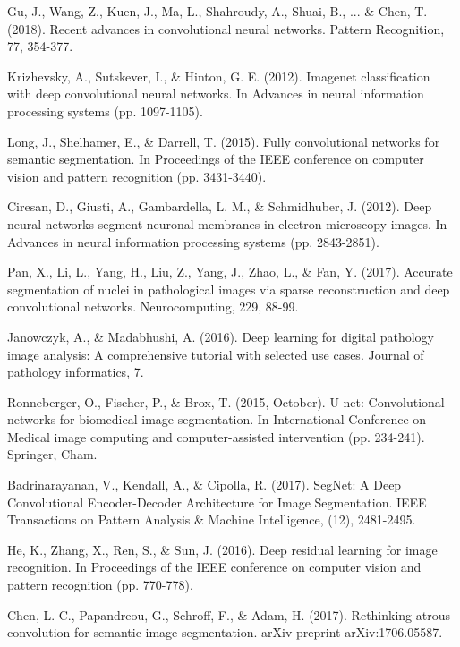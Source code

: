 \documentclass[10pt,twocolumn]{article}
\begin{document}

\begin{thebibliography}{}
Gu, J., Wang, Z., Kuen, J., Ma, L., Shahroudy, A., Shuai, B., ... \& Chen, T. (2018). Recent advances in convolutional neural networks. Pattern Recognition, 77, 354-377.

Krizhevsky, A., Sutskever, I., \& Hinton, G. E. (2012). Imagenet classification with deep convolutional neural networks. In Advances in neural information processing systems (pp. 1097-1105).

Long, J., Shelhamer, E., \& Darrell, T. (2015). Fully convolutional networks for semantic segmentation. In Proceedings of the IEEE conference on computer vision and pattern recognition (pp. 3431-3440).

Ciresan, D., Giusti, A., Gambardella, L. M., \& Schmidhuber, J. (2012). Deep neural networks segment neuronal membranes in electron microscopy images. In Advances in neural information processing systems (pp. 2843-2851).

Pan, X., Li, L., Yang, H., Liu, Z., Yang, J., Zhao, L., \& Fan, Y. (2017). Accurate segmentation of nuclei in pathological images via sparse reconstruction and deep convolutional networks. Neurocomputing, 229, 88-99.

Janowczyk, A., \& Madabhushi, A. (2016). Deep learning for digital pathology image analysis: A comprehensive tutorial with selected use cases. Journal of pathology informatics, 7.

Ronneberger, O., Fischer, P., \& Brox, T. (2015, October). U-net: Convolutional networks for biomedical image segmentation. In International Conference on Medical image computing and computer-assisted intervention (pp. 234-241). Springer, Cham.

Badrinarayanan, V., Kendall, A., \& Cipolla, R. (2017). SegNet: A Deep Convolutional Encoder-Decoder Architecture for Image Segmentation. IEEE Transactions on Pattern Analysis \& Machine Intelligence, (12), 2481-2495.

He, K., Zhang, X., Ren, S., \& Sun, J. (2016). Deep residual learning for image recognition. In Proceedings of the IEEE conference on computer vision and pattern recognition (pp. 770-778).

Chen, L. C., Papandreou, G., Schroff, F., \& Adam, H. (2017). Rethinking atrous convolution for semantic image segmentation. arXiv preprint arXiv:1706.05587.


\end{thebibliography}
\end{document}

